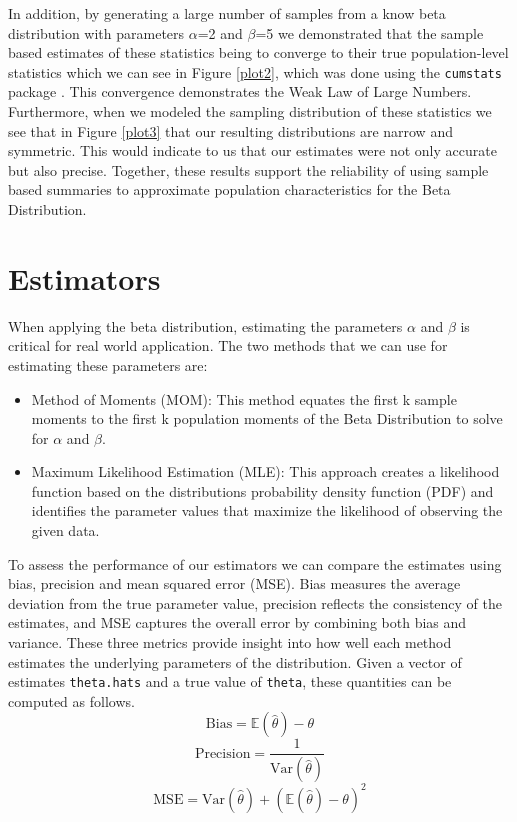 \documentclass{article}\usepackage[]{graphicx}\usepackage[]{xcolor}
\begin{document}
\begin{multicols}{2}
In addition, by generating a large number of samples from a know beta distribution with parameters $\alpha$=2 and $\beta$=5 we demonstrated that the sample based estimates of these statistics being to converge to their true population-level statistics which we can see in Figure \ref{plot2}, which was done using the \texttt{cumstats} package \citep{cumstats}. This convergence demonstrates the Weak Law of Large Numbers. Furthermore, when we modeled the sampling distribution of these statistics we see that in Figure \ref{plot3} that our resulting distributions are narrow and symmetric. This would indicate to us that our estimates were not only accurate but also precise. Together, these results support the reliability of using sample based summaries to approximate population characteristics for the Beta Distribution.


\section{Estimators}
When applying the beta distribution, estimating the parameters $\alpha$ and $\beta$ is critical for real world application.
The two methods that we can use for estimating these parameters are:
\begin{itemize}
\item Method of Moments (MOM): This method equates the first k sample moments to the first k population moments of the Beta Distribution to solve for $\alpha$ and $\beta$.
\item Maximum Likelihood Estimation (MLE): This approach creates a likelihood function based on the distributions probability density function (PDF) and identifies the parameter values that maximize the likelihood of observing the given data.
\end{itemize}


To assess the performance of our estimators we can compare the estimates using bias, precision and mean squared error (MSE). Bias measures the average deviation from the true parameter value, precision reflects the consistency of the estimates, and MSE captures the overall error by combining both bias and variance. These three metrics provide insight into how well each method estimates the underlying parameters of the distribution. Given a vector of estimates \texttt{theta.hats} and a true value of \texttt{theta}, these quantities can be computed as follows. 
\[
\text{Bias} = \mathbb{E}(\hat{\theta}) - \theta
\]
\[
\text{Precision} = \frac{1}{\text{Var}(\hat{\theta})}
\]
\[
\text{MSE} = \text{Var}(\hat{\theta}) + \left( \mathbb{E}(\hat{\theta}) - \theta \right)^2
\]



\end{multicols}
\end{document}
